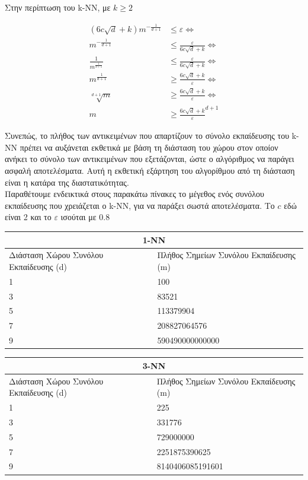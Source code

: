 \documentclass[12pt]{article}
\begin{document}
Στην περίπτωση του k-ΝΝ, με \(k \geq 2\)

\begin{align*}
	(6c \sqrt{d} +k) m^{- \frac{1}{d+1}} &\leq ε \Leftrightarrow \\
	m^{- \frac{1}{d+1}} &\leq \frac{ε}{6c \sqrt{d} + k} \Leftrightarrow \\
	\frac{1}{m^{\frac{1}{d+1}}} &\leq \frac{ε}{6c \sqrt{d} + k} \Leftrightarrow \\
	m^{\frac{1}{d+1}} &\geq \frac{6c \sqrt{d} + k }{ε}\Leftrightarrow \\
	\sqrt[d+1]{m} &\geq \frac{6c \sqrt{d} + k }{ε} \Leftrightarrow \\
	m &\geq \frac{6c \sqrt{d} + k}{ε}^{d+1} 
\end{align*}

Συνεπώς, το πλήθος των αντικειμένων που απαρτίζουν το σύνολο εκπαίδευσης του k-NN πρέπει να αυξάνεται εκθετικά με βάση τη διάσταση του χώρου στον οποίον ανήκει το σύνολο των αντικειμένων που εξετάζονται, ώστε ο αλγόριθμος να παράγει ασφαλή αποτελέσματα. Αυτή η εκθετική εξάρτηση του αλγορίθμου από τη διάσταση είναι η κατάρα της διαστατικότητας. \\ 

Παραθέτουμε ενδεικτικά στους παρακάτω πίνακες το μέγεθος ενός συνόλου εκπαίδευσης που χρειάζεται ο k-NN, για να παράξει σωστά αποτελέσματα. Το  \(c\) εδώ είναι 2 και το \(ε\) ισούται με 0.8 \\

\begin{tabular}{ |p{8cm}|p{8cm}|  }
	\hline
	\multicolumn{2}{|c|}{1-NN} \\
	\hline
	Διάσταση Χώρου Συνόλου Εκπαίδευσης (d) & Πλήθος Σημείων Συνόλου Εκπαίδευσης (m)\\
	\hline
	1   & 100    \\
	3   & 83521    \\
	5   & 113379904    \\
	7   & 208827064576    \\
	9   & 590490000000000    \\
	\hline
\end{tabular}
 
\medspace
 
\begin{tabular}{ |p{8cm}|p{8cm}|  }
	\hline
	\multicolumn{2}{|c|}{3-NN} \\
	\hline
	Διάσταση Χώρου Συνόλου Εκπαίδευσης (d) & Πλήθος Σημείων Συνόλου Εκπαίδευσης (m)\\
	\hline
	1   & 225    \\
	3   & 331776    \\
	5   & 729000000    \\
	7   & 2251875390625    \\
	9   & 8140406085191601    \\
	\hline
\end{tabular}
\end{document}
